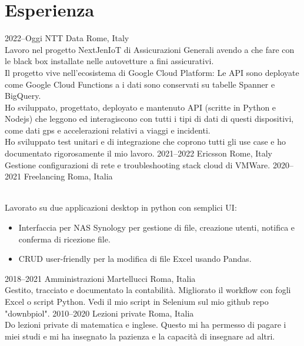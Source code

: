 \documentclass[]{cv-style}          %
\begin{document}
\section{Esperienza}

\begin{entrylist}
\entry
{2022--Oggi}
{NTT Data}
{Rome, Italy}
{\\
Lavoro nel progetto NextJenIoT di Assicurazioni Generali avendo a che fare con le black box installate nelle autovetture a fini assicurativi.\\
Il progetto vive nell'ecosistema di Google Cloud Platform: Le API sono deployate come Google Cloud Functions a i dati sono conservati su tabelle Spanner e BigQuery.\\
Ho sviluppato, progettato, deployato e mantenuto API (scritte in Python e Nodejs) che leggono ed interagiscono con tutti i tipi di dati di questi dispositivi, come dati gps e accelerazioni relativi a viaggi e incidenti.\\
Ho sviluppato test unitari e di integrazione che coprono tutti gli use case e ho documentato rigorosamente il mio lavoro.
}
\entry
{2021--2022}
{Ericsson}
{Rome, Italy}
{\\
Gestione configurazioni di rete e troubleshooting stack cloud di VMWare.}
\entry
  {2020--2021}
  {Freelancing}
  {Roma, Italia}
  {\\
  Lavorato su due applicazioni desktop in python con semplici UI:
  \begin{itemize}
  \item Interfaccia per NAS Synology per gestione di file, creazione utenti, notifica e conferma di ricezione file.
  \item CRUD user-friendly per la modifica di file Excel usando Pandas.
  \end{itemize}
}
\entry
  {2018--2021}
  {Amministrazioni Martellucci}
  {Roma, Italia}
  {\\
  Gestito, tracciato e documentato la contabilità. Migliorato il workflow con fogli Excel o script Python. Vedi il mio script in Selenium sul mio github repo "downbpiol".
}
\entry
  {2010--2020}
  {Lezioni private}
  {Roma, Italia}
  {\\
    Do lezioni private di matematica e inglese. Questo mi ha permesso di pagare i miei studi e mi ha insegnato la pazienza e la capacità di insegnare ad altri.
  }
\end{entrylist}
\end{document}
